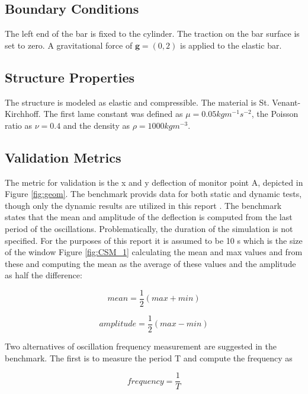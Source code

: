 \documentclass{article}
\begin{document}
\subsection{Boundary Conditions}
The left end of the bar is fixed to the cylinder. The traction on the bar surface is set to zero. A gravitational force of $ \textbf{g} = (0, 2) $ is applied to the elastic bar. 

\subsection{Structure Properties}
The structure is modeled as elastic and compressible. The material is St. Venant-Kirchhoff. The first lame constant was defined as $\mu = 0.05 kg m^{-1}s^{-2}$, the Poisson ratio as $\nu = 0.4$ and the density as $\rho = 1000 kg m^{-3}$.

\subsection{Validation Metrics}

The metric for validation is the x and y deflection of monitor point A, depicted in Figure \ref{fig:geom}. The benchmark provids data for both static and dynamic tests, though only the dynamic results are utilized in this report \cite{turek2006proposal}. The benchmark states that the mean and amplitude of the deflection is computed from the last period of the oscillations. Problematically, the duration of the simulation is not specified. For the purposes of this report it is assumed to be 10 s which is the size of the window Figure \ref{fig:CSM_1}  calculating the mean and max values and from these and computing the mean as the average of these values and the amplitude as half the difference:

\begin{equation}
mean = \frac{1}{2}(max + min)
\end{equation}

\begin{equation}
amplitude = \frac{1}{2}(max - min)
\end{equation}

Two alternatives of oscillation frequency measurement are suggested in the benchmark. The first is to measure the  period T and compute the frequency as

\begin{equation}
frequency = \frac{1}{T}
\end{equation}
\end{document}
